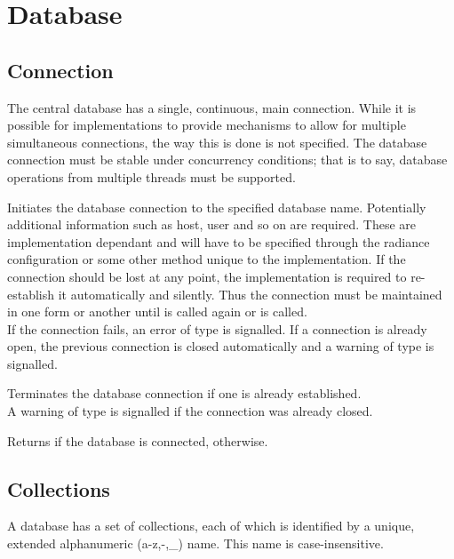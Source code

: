 \section{Database}
\subsection{Connection}
The central database has a single, continuous, main connection. While it is possible for implementations to provide mechanisms to allow for multiple simultaneous connections, the way this is done is not specified. The database connection must be stable under concurrency conditions; that is to say, database operations from multiple threads must be supported.

Initiates the database connection to the specified database name. Potentially additional information such as host, user and so on are required. These are implementation dependant and will have to be specified through the radiance configuration or some other method unique to the implementation. If the connection should be lost at any point, the implementation is required to re-establish it automatically and silently. Thus the connection must be maintained in one form or another until  is called again or  is called. \\

\noindent If the connection fails, an error of type  is signalled. If a connection is already open, the previous connection is closed automatically and a warning of type  is signalled.

Terminates the database connection if one is already established. \\

\noindent A warning of type  is signalled if the connection was already closed.

Returns  if the database is connected,  otherwise.

\subsection{Collections}
A database has a set of collections, each of which is identified by a unique, extended alphanumeric (a-z,-,\_) name. This name is case-insensitive. \\

